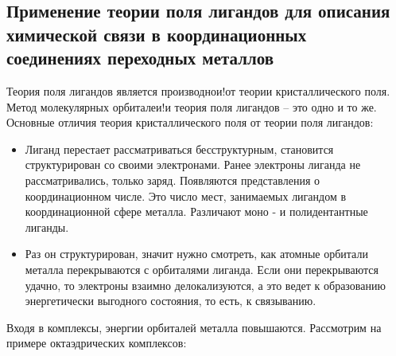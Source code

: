 \subsection{Применение теории поля лигандов для описания химической связи в координационных соединениях переходных металлов}

Теория поля лигандов является производнои!от
теории кристаллического поля.
Метод молекулярных орбиталеи!и теория поля
лигандов
– это одно и то же.
Основные отличия теория кристаллического поля от
теории поля лигандов:
\begin{itemize}
\item Лиганд перестает рассматриваться бесструктурным,
становится структурирован со своими электронами.
Ранее электроны лиганда не рассматривались, только
заряд. Появляются представления о координационном
числе. Это число мест, занимаемых лигандом в
координационной сфере металла. Различают моно
- и
полидентантные лиганды.
\item Раз он структурирован, значит нужно смотреть, как
атомные орбитали металла перекрываются с
орбиталями лиганда. Если они перекрываются удачно,
то электроны взаимно делокализуются, а это ведет к
образованию энергетически выгодного состояния, то
есть, к связыванию.
\end{itemize}
Входя в комплексы, энергии орбиталей металла
повышаются. Рассмотрим на примере октаэдрических
комплексов:

